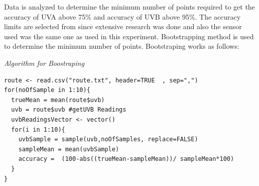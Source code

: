 \documentclass[12pt,fullpage,doublespace]{article}
\begin{document}
Data is analyzed to determine the minimum number of points required to get the accuracy of UVA above 75\% and accuracy of UVB above 95\%. The accuracy limits are selected from \cite{uvguardian} since extensive research was done and also the sensor used was the same one as used in this experiment. Bootstrapping method is used to determine the minimum number of points. Bootstraping works as follows:
\\
\begin{center}
{ 	

\begin{center} 
{\small \sl Algorithm for Boostraping \\}
\end{center} 
}
\end{center}
\newpage
\lstset{caption=R Code for Bootstraping,breaklines=true, tabsize=4, frame=single}
\begin{lstlisting}
route <- read.csv("route.txt", header=TRUE  , sep=",")
for(noOfSample in 1:10){  
  trueMean = mean(route$uvb)
  uvb = route$uvb #getUVB Readings
  uvbReadingsVector <- vector()
  for(i in 1:10){
    uvbSample = sample(uvb,noOfSamples, replace=FALSE)
    sampleMean = mean(uvbSample)
    accuracy =  (100-abs((trueMean-sampleMean))/ sampleMean*100)
  }
}\end{lstlisting}
\end{document}
